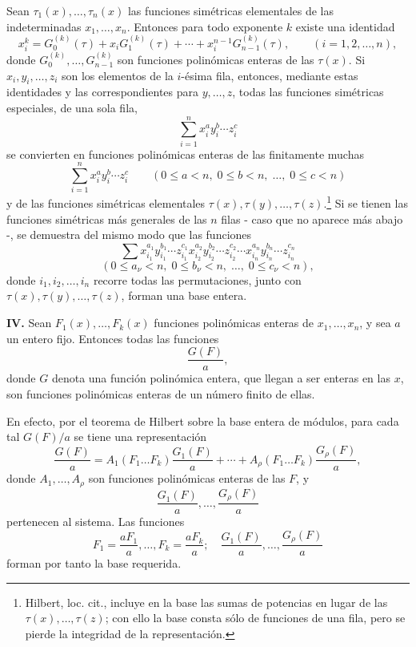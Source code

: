 Sean \(\tau_1(x),\ldots,\tau_n(x)\) las funciones simétricas elementales de las indeterminadas \(x_1,\ldots,x_n\). Entonces para todo exponente \(k\) existe una identidad
\[
        x_i^k = G_0^{(k)}(\tau)+x_iG_1^{(k)}(\tau)+\cdots+x_i^{n-1}G_{n-1}^{(k)}(\tau),
        \qquad (i=1,2,\ldots,n),
\]
donde \(G_0^{(k)},\ldots,G_{n-1}^{(k)}\) son funciones polinómicas enteras de las \(\tau(x)\). Si \(x_i,y_i,\ldots,z_i\) son los elementos de la \(i\)-ésima fila, entonces, mediante estas identidades y las correspondientes para \(y,\ldots,z\), todas las funciones simétricas especiales, de una sola fila,
\[
        \sum_{i=1}^n x_i^{a}y_i^{b}\cdots z_i^{c}
\]
se convierten en funciones polinómicas enteras de las finitamente muchas
\[
        \sum_{i=1}^n x_i^{a}y_i^{b}\cdots z_i^{c}
        \qquad
        (0\le a<n,\;0\le b<n,\;\ldots,\;0\le c<n)
\]
y de las funciones simétricas elementales \(\tau(x),\tau(y),\ldots,\tau(z)\).\footnote{Hilbert, loc. cit., incluye en la base las sumas de potencias en lugar de las \(\tau(x),\ldots,\tau(z)\); con ello la base consta sólo de funciones de una fila, pero se pierde la integridad de la representación.}
Si se tienen las funciones simétricas más generales de las \(n\) filas - caso que no aparece más abajo -, se demuestra del mismo modo que las funciones
\[
        \sum x_{i_1}^{a_1}y_{i_1}^{b_1}\cdots z_{i_1}^{c_1}
              x_{i_2}^{a_2}y_{i_2}^{b_2}\cdots z_{i_2}^{c_2}
              \cdots
              x_{i_n}^{a_n}y_{i_n}^{b_n}\cdots z_{i_n}^{c_n}
\]
\[
        (0\le a_\nu<n,\;0\le b_\nu<n,\;\ldots,\;0\le c_\nu<n),
\]
donde \(i_1,i_2,\ldots,i_n\) recorre todas las permutaciones, junto con \(\tau(x),\tau(y),\ldots,\tau(z)\), forman una base entera.

\textbf{IV.} Sean \(F_1(x),\ldots,F_k(x)\) funciones polinómicas enteras de \(x_1,\ldots,x_n\), y sea \(a\) un entero fijo. Entonces todas las funciones
\[
        \frac{G(F)}{a},
\]
donde \(G\) denota una función polinómica entera, que llegan a ser enteras en las \(x\), son funciones polinómicas enteras de un número finito de ellas.

En efecto, por el teorema de Hilbert sobre la base entera de módulos, para cada tal \(G(F)/a\) se tiene una representación
\[
 \frac{G(F)}{a}
 =
 A_1(F_1\ldots F_k)\frac{G_1(F)}{a}
 +\cdots+
 A_\rho(F_1\ldots F_k)\frac{G_\rho(F)}{a},
\]
donde \(A_1,\ldots,A_\rho\) son funciones polinómicas enteras de las \(F\), y
\[
        \frac{G_1(F)}{a},\ldots,\frac{G_\rho(F)}{a}
\]
pertenecen al sistema. Las funciones
\[
        F_1=\frac{aF_1}{a},\ldots,F_k=\frac{aF_k}{a};
        \quad
        \frac{G_1(F)}{a},\ldots,\frac{G_\rho(F)}{a}
\]
forman por tanto la base requerida.

